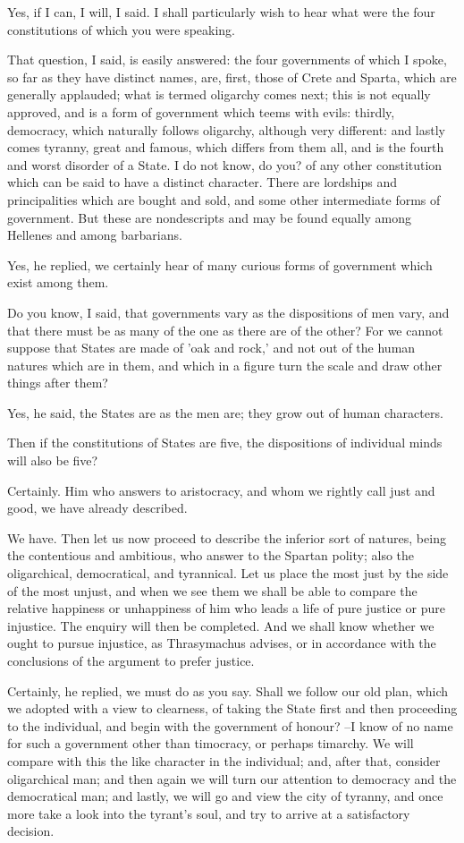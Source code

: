 Yes, if I can, I will, I said.
I shall particularly wish to hear what were the four constitutions of which you were speaking.

That question, I said, is easily answered: the four governments of which I spoke, so far as they have distinct names, are, first, those of Crete and Sparta, which are generally applauded; what is termed oligarchy comes next; this is not equally approved, and is a form of government which teems with evils: thirdly, democracy, which naturally follows oligarchy, although very different: and lastly comes tyranny, great and famous, which differs from them all, and is the fourth and worst disorder of a State. I do not know, do you? of any other constitution which can be said to have a distinct character. There are lordships and principalities which are bought and sold, and some other intermediate forms of government. But these are nondescripts and may be found equally among Hellenes and among barbarians.

Yes, he replied, we certainly hear of many curious forms of government which exist among them.

Do you know, I said, that governments vary as the dispositions of men vary, and that there must be as many of the one as there are of the other? For we cannot suppose that States are made of 'oak and rock,' and not out of the human natures which are in them, and which in a figure turn the scale and draw other things after them?

Yes, he said, the States are as the men are; they grow out of human characters.

Then if the constitutions of States are five, the dispositions of individual minds will also be five?

Certainly.
Him who answers to aristocracy, and whom we rightly call just and good, we have already described.

We have.
Then let us now proceed to describe the inferior sort of natures, being the contentious and ambitious, who answer to the Spartan polity; also the oligarchical, democratical, and tyrannical. Let us place the most just by the side of the most unjust, and when we see them we shall be able to compare the relative happiness or unhappiness of him who leads a life of pure justice or pure injustice. The enquiry will then be completed. And we shall know whether we ought to pursue injustice, as Thrasymachus advises, or in accordance with the conclusions of the argument to prefer justice.

Certainly, he replied, we must do as you say.
Shall we follow our old plan, which we adopted with a view to clearness, of taking the State first and then proceeding to the individual, and begin with the government of honour? --I know of no name for such a government other than timocracy, or perhaps timarchy. We will compare with this the like character in the individual; and, after that, consider oligarchical man; and then again we will turn our attention to democracy and the democratical man; and lastly, we will go and view the city of tyranny, and once more take a look into the tyrant's soul, and try to arrive at a satisfactory decision.

